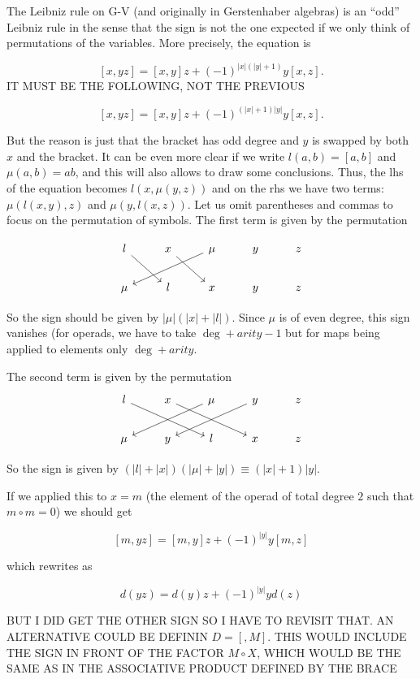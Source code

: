 \documentclass[twoside]{article}
\begin{document}
\begin{remark}
The Leibniz rule on G-V (and originally in Gerstenhaber algebras) is an ``odd'' Leibniz rule in the sense that the sign is not the one expected if we only think of permutations of the variables. More precisely, the equation is

$$[x,yz]=[x,y]z+(-1)^{|x|(|y|+1)}y[x,z].$$
IT MUST BE THE FOLLOWING, NOT THE PREVIOUS

$$[x,yz]=[x,y]z+(-1)^{(|x|+1)|y|}y[x,z].$$

But the reason is just that the bracket has odd degree and $y$ is swapped by both $x$ and the bracket. It can be even more clear if we write $l(a,b)=[a,b]$ and $\mu(a,b)=ab$, and this will also allows to draw some conclusions. Thus, the lhs of the equation becomes $l(x,\mu(y,z))$ and on the rhs we have two terms: $\mu(l(x,y),z)$ and $\mu(y,l(x,z))$. Let us omit parentheses and commas to focus on the permutation of symbols. The first term is given by the permutation

\[
\begin{tikzcd}
l\arrow[dr] & x\arrow[dr] & \mu\arrow[dll] & y & z\\
\mu & l & x & y & z
\end{tikzcd}
\]

So the sign should be given by $|\mu|(|x|+|l|)$. Since $\mu$ is of even degree, this sign vanishes (for operads, we have to take $\deg+arity-1$ but for maps being applied to elements only $\deg+arity$.

The second term is given by the permutation
\[
\begin{tikzcd}
l \arrow[drr]& x\arrow[drr] & \mu\arrow[dll] & y\arrow[dll] & z\\
\mu & y & l & x & z
\end{tikzcd}
\]

So the sign is given by $(|l|+|x|)(|\mu|+|y|)\equiv (|x|+1)|y|$. 

If we applied this to $x=m$ (the element of the operad of total degree $2$ such that $m\circ m=0$) we should get

$$[m,yz]=[m,y]z+(-1)^{|y|}y[m,z]$$

which rewrites as

$$d(yz)=d(y)z+(-1)^{|y|}yd(z)$$

BUT I DID GET THE OTHER SIGN SO I HAVE TO REVISIT THAT. AN ALTERNATIVE COULD BE DEFININ $D=[,M]$. THIS WOULD INCLUDE THE SIGN IN FRONT OF THE FACTOR $M \circ X$, WHICH WOULD BE THE SAME AS IN THE ASSOCIATIVE PRODUCT DEFINED BY THE BRACE


\end{remark}
\end{document}

